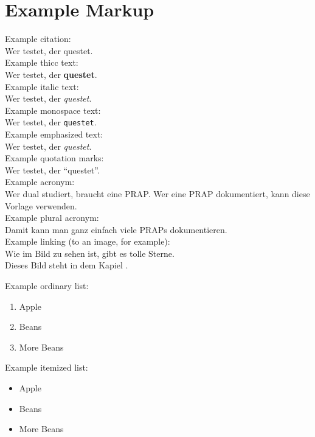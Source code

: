 %
%

\chapter{Example Markup}
\label{chap:example-markup}

Example citation:\\
Wer testet, der questet.\cite{bib:vodafone-legt-in-pirmasens}\\

Example thicc text:\\
Wer testet, der \textbf{questet}.\\

Example italic text:\\
Wer testet, der \textit{questet}.\\

Example monospace text:\\
Wer testet, der \texttt{questet}.\\

Example emphasized text:\\
Wer testet, der \emph{questet}.\\

Example quotation marks:\\
Wer testet, der \enquote{questet}.\\

Example acronym:\\
Wer dual studiert, braucht eine \ac{PRAP}. Wer eine \ac{PRAP} dokumentiert, kann diese Vorlage verwenden.\\

Example plural acronym:\\
Damit kann man ganz einfach viele \acp{PRAP} dokumentieren.\\

Example linking (to an image, for example):\\
Wie im Bild  zu sehen ist, gibt es tolle Sterne.\\
Dieses Bild steht in dem Kapiel .

Example ordinary list:\\
\begin{enumerate}
    \item Apple
    \item Beans
    \item More Beans
\end{enumerate}

Example itemized list:\\
\begin{itemize}
    \item Apple
    \item Beans
    \item More Beans
\end{itemize}

